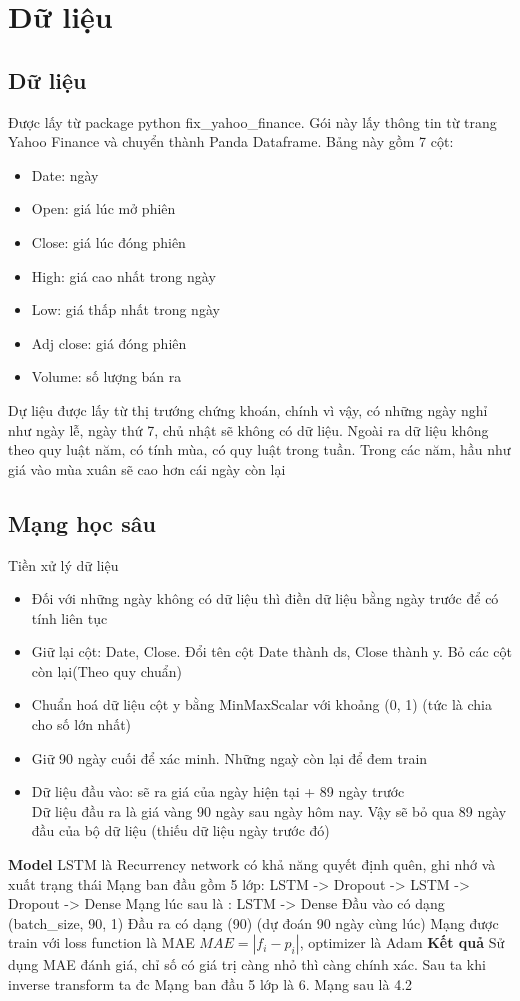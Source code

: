 %
\chapter{Dữ liệu}
\label{sec:data}

\section{Dữ liệu}
Được lấy từ package python fix_yahoo_finance. Gói này lấy thông tin từ trang Yahoo Finance và chuyển thành Panda Dataframe.
Bảng này gồm 7 cột:
\begin{itemize}
    \item Date: ngày
    \item Open: giá lúc mở phiên
    \item Close: giá lúc đóng phiên
    \item High: giá cao nhất trong ngày
    \item Low: giá thấp nhất trong ngày
    \item Adj close: giá đóng phiên
    \item Volume: số lượng bán ra
\end{itemize}

Dự liệu được lấy từ thị trướng chứng khoán, chính vì vậy, có những ngày nghỉ như ngày lễ, ngày thứ 7, chủ nhật sẽ không có dữ liệu.
Ngoài ra dữ liệu không theo quy luật năm, có tính mùa, có quy luật trong tuần. Trong các năm, hầu như giá vào mùa xuân sẽ cao hơn cái ngày còn lại


\section{Mạng học sâu}
Tiền xử lý dữ liệu
\begin{itemize}
    \item Đối với những ngày không có dữ liệu thì điền dữ liệu bằng ngày trước để có tính liên tục
    \item Giữ lại cột: Date, Close. Đổi tên cột Date thành ds, Close thành y. Bỏ các cột còn lại(Theo quy chuẩn)
    \item Chuẩn hoá dữ liệu cột y bằng MinMaxScalar với khoảng (0, 1) (tức là chia cho số lớn nhất)
    \item Giữ 90 ngày cuối để xác minh. Những ngaỳ còn lại để đem train
    \item Dữ liệu đầu vào: sẽ ra giá của ngày hiện tại + 89 ngày trước \\
    Dữ liệu đầu ra là giá vàng 90 ngày sau ngày hôm nay. Vậy sẽ bỏ qua 89 ngày đầu của bộ dữ liệu (thiếu dữ liệu ngày trước đó)
\end{itemize}
\textbf{Model}
    LSTM là Recurrency network có khả năng quyết định quên, ghi nhớ và xuất trạng thái
    Mạng ban đầu gồm 5 lớp: LSTM -> Dropout -> LSTM -> Dropout -> Dense
    Mạng lúc sau là : LSTM -> Dense
    Đầu vào có dạng (batch_size, 90, 1)
    Đầu ra có dạng (90) (dự đoán 90 ngày cùng lúc)
    Mạng được train với loss function là MAE \(MAE = |f_i - p_i|\), optimizer là Adam
\textbf{Kết quả}
    Sử dụng MAE đánh giá, chỉ số có giá trị càng nhỏ thì càng chính xác. Sau ta khi inverse transform ta đc
    Mạng ban đầu 5 lớp là 6.
    Mạng sau là 4.2
\item


